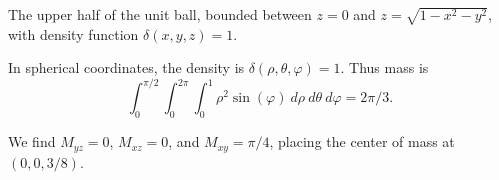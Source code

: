 {
The upper half of the unit ball, bounded between $z= 0$ and $z=\sqrt{1-x^2-y^2}$, with density function $\delta(x,y,z) =1$.
}
{In spherical coordinates, the density is $\delta(\rho,\theta,\varphi) = 1$. Thus mass is
$$\int_0^{\pi/2}\int_0^{2\pi}\int_{0}^{1} \rho^2\sin(\varphi)\ d\rho\ d\theta\ d\varphi = 2\pi/3.$$

We find $M_{yz} = 0$, $M_{xz} = 0$, and $M_{xy} = \pi/4$, placing the center of mass at $(0,0,3/8)$.
}

